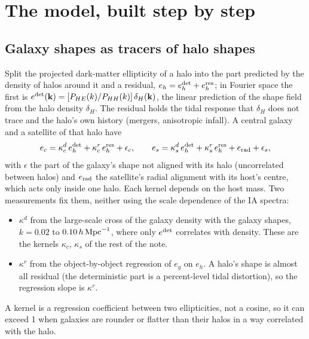 \documentclass[11pt]{article}
\newcommand{\hMpc}{\,h\,{\rm Mpc}^{-1}}
\newcommand{\kc}{\kappa_c}
\newcommand{\ks}{\kappa_s}
\newcommand{\KlsLo}{0.02}       %
\newcommand{\KlsHi}{0.10}
\begin{document}
\section{The model, built step by step}

\subsection{Galaxy shapes as tracers of halo shapes}

Split the projected dark-matter ellipticity of a halo into the part
predicted by the density of halos around it and a residual,
$e_h=e_h^{\rm det}+e_h^{\rm res}$; in Fourier space the first is
$e^{\rm det}(\mathbf k)=[P_{HE}(k)/P_{HH}(k)]\,\delta_H(\mathbf k)$, the
linear prediction of the shape field from the halo density $\delta_H$.
The residual holds the tidal response that $\delta_H$ does not trace and
the halo's own history (mergers, anisotropic infall). A central galaxy and
a satellite of that halo have
\begin{equation}
e_c = \kappa^d_c\,e_h^{\rm det}+\kappa^r_c\,e_h^{\rm res} + \epsilon_c, \qquad
e_s = \kappa^d_s\,e_h^{\rm det}+\kappa^r_s\,e_h^{\rm res} + e_{\rm rad} + \epsilon_s ,
\label{eq:kernel}
\end{equation}
with $\epsilon$ the part of the galaxy's shape not aligned with its halo
(uncorrelated between halos) and $e_{\rm rad}$ the satellite's radial
alignment with its host's centre, which acts only inside one halo. Each
kernel depends on the host mass. Two measurements fix them, neither
using the scale dependence of the IA spectra:
\begin{itemize}
\item $\kappa^d$ from the large-scale cross of the galaxy density with
the galaxy shapes, $k=\KlsLo$ to $\KlsHi\hMpc$, where only $e^{\rm det}$
correlates with density. These are the kernels $\kc$, $\ks$ of the rest
of the note.
\item $\kappa^r$ from the object-by-object regression of $e_g$ on $e_h$.
A halo's shape is almost all residual (the deterministic part is a
percent-level tidal distortion), so the regression slope is $\kappa^r$.
\end{itemize}
A kernel is a regression coefficient between two ellipticities, not a
cosine, so it can exceed 1 when galaxies are rounder or flatter than
their halos in a way correlated with the halo.
\end{document}
